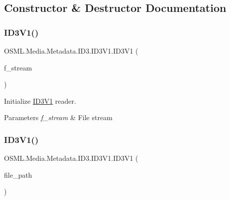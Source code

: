 \subsection{Constructor \& Destructor Documentation}
\mbox{\label{classOSML_1_1Media_1_1Metadata_1_1ID3_1_1ID3V1_a9cdd3523c5ebb8c9da4d8fc70123fc7f}} 
\subsubsection{\texorpdfstring{ID3V1()}{ID3V1()}\hspace{0.1cm}{\footnotesize\ttfamily [1/2]}}
{\footnotesize\ttfamily O\+S\+M\+L.\+Media.\+Metadata.\+I\+D3.\+I\+D3\+V1.\+I\+D3\+V1 (\begin{DoxyParamCaption}\item[{File\+Stream}]{f\+\_\+stream }\end{DoxyParamCaption})\hspace{0.3cm}{\ttfamily [inline]}}



Initialize \mbox{\hyperlink{classOSML_1_1Media_1_1Metadata_1_1ID3_1_1ID3V1}{I\+D3\+V1}} reader. 


\begin{DoxyParams}{Parameters}
{\em f\+\_\+stream} & File stream\\
\hline
\end{DoxyParams}
\mbox{\label{classOSML_1_1Media_1_1Metadata_1_1ID3_1_1ID3V1_a7d3a5eb0d0d6526d23e539b8abe91aae}} 
\subsubsection{\texorpdfstring{ID3V1()}{ID3V1()}\hspace{0.1cm}{\footnotesize\ttfamily [2/2]}}
{\footnotesize\ttfamily O\+S\+M\+L.\+Media.\+Metadata.\+I\+D3.\+I\+D3\+V1.\+I\+D3\+V1 (\begin{DoxyParamCaption}\item[{string}]{file\+\_\+path }\end{DoxyParamCaption})\hspace{0.3cm}{\ttfamily [inline]}}



